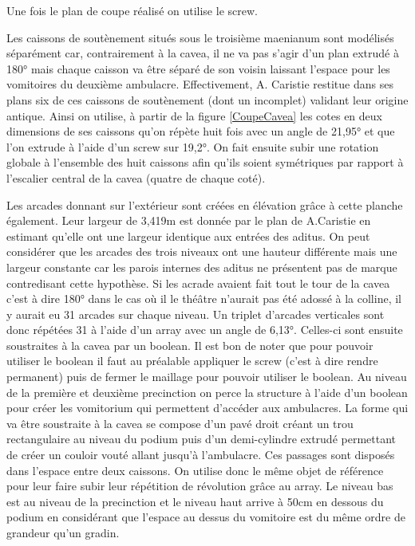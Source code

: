 Une fois le plan de coupe réalisé on utilise le \gls{screw}. 

Les caissons de soutènement situés sous le troisième \gls{maenianum} sont modélisés séparément car, contrairement à la cavea, il ne va pas s'agir d'un plan extrudé à 180° mais chaque caisson va être séparé de son voisin laissant l'espace pour les vomitoires du deuxième ambulacre. Effectivement, A. Caristie restitue dans ses plans six de ces caissons de soutènement (dont un incomplet) validant leur origine antique. Ainsi on utilise, à partir de la figure \ref{CoupeCavea} les cotes en deux dimensions de ses caissons qu'on répète huit fois avec un angle de 21,95° et que l'on extrude à l'aide d'un \gls{screw} sur 19,2°. On fait ensuite subir une rotation globale à l'ensemble des huit caissons afin qu'ils soient symétriques par rapport à l'escalier central de la cavea (quatre de chaque coté). 

Les arcades donnant sur l'extérieur sont créées en élévation grâce à cette planche également. Leur largeur de 3,419m est donnée par le plan de A.Caristie \cite[Pl. XXXIII]{orangePl} en estimant qu'elle ont une largeur identique aux entrées des \gls{aditus}. On peut considérer que les arcades des trois niveaux ont une hauteur différente mais une largeur constante car les parois internes des \gls{aditus} ne présentent pas de marque contredisant cette hypothèse. Si les acrade avaient fait tout le tour de la cavea c'est à dire 180° dans le cas où il le théâtre n'aurait pas été adossé à la colline, il y aurait eu 31 arcades sur chaque niveau. Un triplet d'arcades verticales sont donc répétées 31 à l'aide d'un \gls{array} avec un angle de 6,13°. Celles-ci sont ensuite soustraites à la \gls{cavea} par un \gls{boolean}. Il est bon de noter que pour pouvoir utiliser le \gls{boolean} il faut au préalable appliquer le \gls{screw} (c'est à dire rendre permanent) puis de fermer le maillage pour pouvoir utiliser le \gls{boolean}. Au niveau de la première et deuxième \gls{precinction} on perce la structure à l'aide d'un \gls{boolean} pour créer les \gls{vomitorium} qui permettent d'accéder aux ambulacres. La forme qui va être soustraite à la cavea se compose d'un pavé droit créant un trou rectangulaire au niveau du podium puis d'un demi-cylindre extrudé permettant de créer un couloir vouté allant jusqu'à l'ambulacre. Ces passages sont disposés dans l'espace entre deux caissons. On utilise donc le même objet de référence pour leur faire subir leur répétition de révolution grâce au \gls{array}. Le niveau bas est au niveau de la \gls{precinction} et le niveau haut arrive à 50cm en dessous du podium en considérant que l'espace au dessus du vomitoire est du même ordre de grandeur qu'un gradin. 


